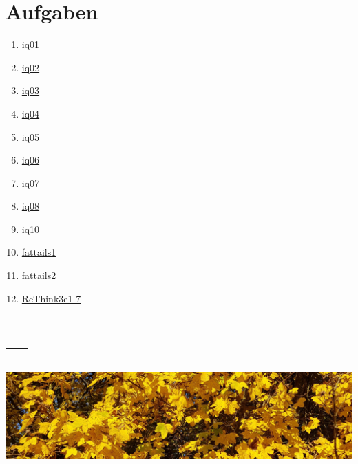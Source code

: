 \documentclass[
  a4paper,
  DIV=11]{scrreprt}
\providecommand{\tightlist}{%
  \setlength{\itemsep}{0pt}\setlength{\parskip}{0pt}}\usepackage{longtable,booktabs,array}
\theoremstyle{definition}
\theoremstyle{remark}
\begin{document}
\hypertarget{aufgaben-4}{%
\section{Aufgaben}\label{aufgaben-4}}

\begin{enumerate}
\def\labelenumi{\arabic{enumi}.}
\tightlist
\item
  \href{https://datenwerk.netlify.app/posts/iq01/iq01.html}{iq01}
\item
  \href{https://datenwerk.netlify.app/posts/iq02/iq02.html}{iq02}
\item
  \href{https://datenwerk.netlify.app/posts/iq03/iq03.html}{iq03}
\item
  \href{https://datenwerk.netlify.app/posts/iq04/iq04.html}{iq04}
\item
  \href{https://datenwerk.netlify.app/posts/iq05/iq05.html}{iq05}
\item
  \href{https://datenwerk.netlify.app/posts/iq06/iq06.html}{iq06}
\item
  \href{https://datenwerk.netlify.app/posts/iq07/iq07.html}{iq07}
\item
  \href{https://datenwerk.netlify.app/posts/iq08/iq08.html}{iq08}
\item
  \href{https://datenwerk.netlify.app/posts/iq10/iq10.html}{iq10}
\item
  \href{https://datenwerk.netlify.app/posts/fattails01/fattails01.html}{fattails1}
\item
  \href{https://datenwerk.netlify.app/posts/fattails02/fattails02.html}{fattails2}
\item
  \href{https://datenwerk.netlify.app/posts/rethink3e1-7/rethink3e1-7}{ReThink3e1-7}
\end{enumerate}

\hypertarget{section-5}{%
\section{---}\label{section-5}}

\includegraphics[width=1\textwidth,height=\textheight]{./img/outro-06.jpg}
\end{document}
